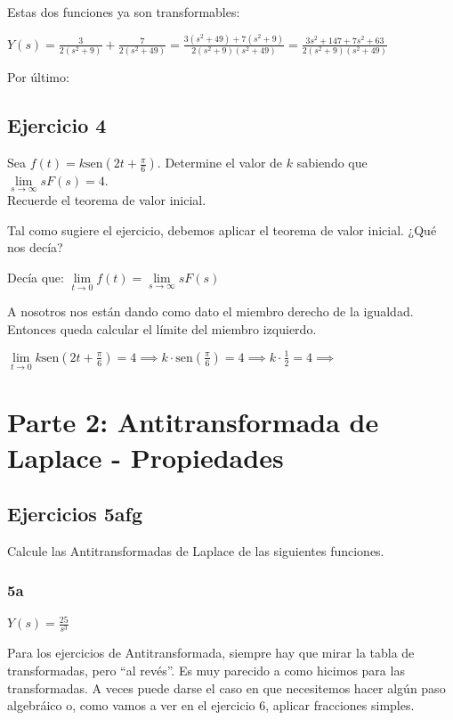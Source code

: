 \documentclass[11pt]{article}
\def\sen{\mathrm{sen}}
\begin{document}
	Estas dos funciones ya son transformables:
	
	$\displaystyle Y(s)=\frac{3}{2(s^{2}+9)}+\frac{7}{2(s^{2}+49)}=\frac{3(s^{2}+49)+7(s^{2}+9)}{2(s^{2}+9)(s^{2}+49)}=\frac{3s^2+147+7s^2+63}{2(s^2+9)(s^2+49)}$
	
	Por último: 
	
	\subsection{Ejercicio 4}
	Sea $\displaystyle f(t)=k\sen\left(2t+\frac{\pi}{6}\right)$. Determine el valor de $k$ sabiendo que $\lim\limits_{s \rightarrow \infty} sF(s)=4$.\\
	Recuerde el teorema de valor inicial.
	
	Tal como sugiere el ejercicio, debemos aplicar el teorema de valor inicial. ¿Qué nos decía?
	
	Decía que: $\lim\limits_{t \rightarrow 0} f(t)=\lim\limits_{s \rightarrow \infty}sF(s)$
	
	A nosotros nos están dando como dato el miembro derecho de la igualdad. Entonces queda calcular el límite del miembro izquierdo.
	
	$\displaystyle \lim\limits_{t \rightarrow 0}k\sen\left(2t+\frac{\pi}{6}\right)=4 \implies k\cdot\sen\left(\frac{\pi}{6}\right)=4 \implies k\cdot \frac{1}{2}=4 \implies$
	
	\section{Parte 2: Antitransformada de Laplace - Propiedades}
	\subsection{Ejercicios 5afg}
	Calcule las Antitransformadas de Laplace de las siguientes funciones.
	
	\subsubsection{5a}
	$\displaystyle Y(s)=\frac{25}{s^{3}}$
	
	Para los ejercicios de Antitransformada, siempre hay que mirar la tabla de transformadas, pero ``al revés''. Es muy parecido a como hicimos para las transformadas. A veces puede darse el caso en que necesitemos hacer algún paso algebráico o, como vamos a ver en el ejercicio 6, aplicar fracciones simples.
	
\end{document}
